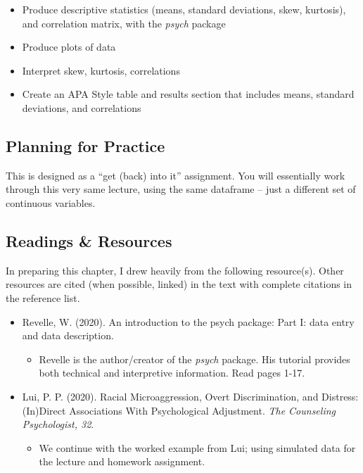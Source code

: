 \documentclass[
  english,
]{book}
\providecommand{\tightlist}{%
  \setlength{\itemsep}{0pt}\setlength{\parskip}{0pt}}
\begin{document}
\begin{itemize}
\tightlist
\item
  Produce descriptive statistics (means, standard deviations, skew, kurtosis), and correlation matrix, with the \emph{psych} package
\item
  Produce plots of data
\item
  Interpret skew, kurtosis, correlations
\item
  Create an APA Style table and results section that includes means, standard deviations, and correlations
\end{itemize}

\hypertarget{planning-for-practice}{%
\subsection{Planning for Practice}\label{planning-for-practice}}

This is designed as a ``get (back) into it'' assignment. You will essentially work through this very same lecture, using the same dataframe -- just a different set of continuous variables.

\hypertarget{readings-resources}{%
\subsection{Readings \& Resources}\label{readings-resources}}

In preparing this chapter, I drew heavily from the following resource(s). Other resources are cited (when possible, linked) in the text with complete citations in the reference list.

\begin{itemize}
\tightlist
\item
  Revelle, W. (2020). An introduction to the psych package: Part I: data entry and data description.

  \begin{itemize}
  \tightlist
  \item
    Revelle is the author/creator of the \emph{psych} package. His tutorial provides both technical and interpretive information. Read pages 1-17.
  \end{itemize}
\item
  Lui, P. P. (2020). Racial Microaggression, Overt Discrimination, and Distress: (In)Direct Associations With Psychological Adjustment. \emph{The Counseling Psychologist, 32}.

  \begin{itemize}
  \tightlist
  \item
    We continue with the worked example from Lui; using simulated data for the lecture and homework assignment.
  \end{itemize}
\end{itemize}
\end{document}
